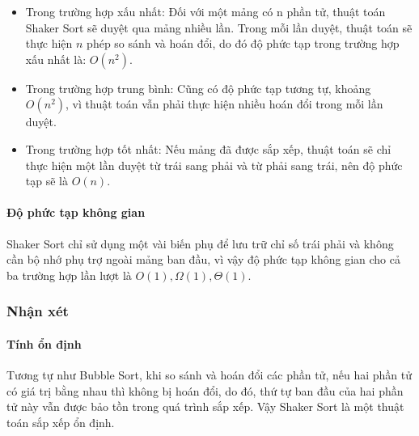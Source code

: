 \begin{itemize}
    \item Trong trường hợp xấu nhất: Đối với một mảng có n phần tử, thuật toán Shaker Sort sẽ duyệt qua mảng nhiều lần. Trong mỗi lần duyệt, thuật toán sẽ thực hiện $n$ phép so sánh và hoán đổi, do đó độ phức tạp trong trường hợp xấu nhất là: $O(n^2)$.
    \item Trong trường hợp trung bình: Cũng có độ phức tạp tương tự, khoảng $O(n^2)$, vì thuật toán vẫn phải thực hiện nhiều hoán đổi trong mỗi lần duyệt.
    \item Trong trường hợp tốt nhất: Nếu mảng đã được sắp xếp, thuật toán sẽ chỉ thực hiện một lần duyệt từ trái sang phải và từ phải sang trái, nên độ phức tạp sẽ là $O(n)$.
\end{itemize}

\paragraph{Độ phức tạp không gian}

Shaker Sort chỉ sử dụng một vài biến phụ để lưu trữ chỉ số trái phải và không cần bộ nhớ phụ trợ ngoài mảng ban đầu, vì vậy độ phức tạp không gian cho cả ba trường hợp lần lượt là $O(1), \Omega(1), \Theta(1)$.

\subsubsection{Nhận xét}

\paragraph{Tính ổn định} Tương tự như Bubble Sort, khi so sánh và hoán đổi các phần tử, nếu hai phần tử có giá trị bằng nhau thì không bị hoán đổi, do đó, thứ tự ban đầu của hai phần tử này vẫn được bảo tồn trong quá trình sắp xếp. Vậy Shaker Sort là một thuật toán sắp xếp ổn định.


